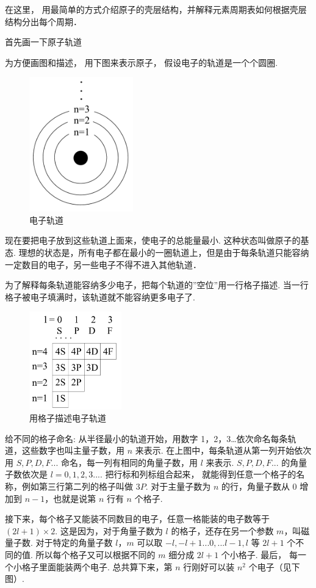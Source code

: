 在这里， 用最简单的方式介绍原子的壳层结构，并解释元素周期表如何根据壳层结构分出每个周期．

首先画一下原子轨道

为方便画图和描述， 用下图来表示原子， 假设电子的轨道是一个个圆圈.
\begin{figure}[ht]
\centering
\includegraphics[width=4.5cm]{./figures/Ptable1.pdf}
\caption{电子轨道} 
\end{figure}
现在要把电子放到这些轨道上面来，使电子的总能量最小. 这种状态叫做原子的基态. 理想的状态是，所有电子都在最小的一圈轨道上，但是由于每条轨道只能容纳一定数目的电子，另一些电子不得不进入其他轨道．

为了解释每条轨道能容纳多少电子，把每个轨道的”空位”用一行格子描述. 当一行格子被电子填满时，该轨道就不能容纳更多电子了.
\begin{figure}[ht]
\centering
\includegraphics[width=4cm]{./figures/Ptable2.pdf}
\caption{用格子描述电子轨道} 
\end{figure}
给不同的格子命名: 从半径最小的轨道开始，用数字 1，2，3…依次命名每条轨道，这些数字也叫主量子数，用 $n$ 来表示. 在上图中，每条轨道从第一列开始依次用 $S,P,D,F...$ 命名，每一列有相同的角量子数，用 $l$ 来表示.  $S,P,D,F...$ 的角量子数依次是 $l = 0,1,2,3...$. 把行标和列标组合起来， 就能得到任意一个格子的名称，例如第三行第二列的格子叫做 $3P$. 对于主量子数为 $n$ 的行，角量子数从 0 增加到 $n-1$，也就是说第 $n$ 行有 $n$ 个格子.

接下来，每个格子又能装不同数目的电子，任意一格能装的电子数等于 $(2l + 1) \times 2$. 这是因为，对于角量子数为 $l$ 的格子，还存在另一个参数 $m$，叫磁量子数. 对于特定的角量子数 $l$，$m$ 可以取 $ - l, - l + 1...0,...l - 1,l$ 等 $2l + 1$ 个不同的值. 所以每个格子又可以根据不同的 $m$ 细分成 $2l+1$ 个小格子. 最后， 每一个小格子里面能装两个电子. 总共算下来，第 $n$ 行刚好可以装 $n^2$ 个电子（见下图）.

